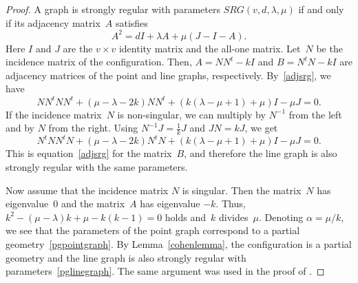 \documentclass[12pt, reqno]{amsart}
\begin{document}
\begin{proof}
A graph is strongly regular with parameters $SRG(v,d,\lambda,\mu)$ if and only if its adjacency matrix~$A$
satisfies
\begin{equation}\label{adjsrg}
A^2= dI+\lambda A+\mu (J-I-A).
\end{equation}
Here $I$ and $J$ are the $v\times v$ identity matrix and the
all-one matrix. Let~$N$ be the incidence matrix of the configuration. Then, $A=N N^t-k I$ and $B=N^t N-k I$
are adjacency matrices of the point and line graphs, respectively.
By~\eqref{adjsrg}, we have
\begin{equation*}
N N^t N N^t +(\mu-\lambda-2k)N N^t+(k(\lambda-\mu+1)+\mu)I - \mu
J=0.
\end{equation*}
If the incidence matrix~$N$ is non-singular, we can multiply by $N^{-1}$ from the left
and by $N$ from the right. Using $N^{-1} J = \frac{1}{k} J$ and $J N=k J$, we get
\begin{equation*}
N^t N N^t N + (\mu-\lambda-2k)N^t N +(k(\lambda-\mu+1)+\mu)I - \mu
J=0.
\end{equation*}
This is equation~\eqref{adjsrg} for the matrix~$B$, and therefore the line graph is
also strongly regular with the same parameters.

Now assume that the incidence matrix $N$ is singular. Then the matrix~$N$ has eigenvalue~$0$
and the matrix~$A$ has eigenvalue $-k$. Thus, $k^2-(\mu-\lambda)k+\mu-k(k-1)=0$ holds
and~$k$ divides~$\mu$. Denoting $\alpha=\mu/k$, we see that the parameters of the point graph
correspond to a partial geometry~\eqref{pgpointgraph}. By Lemma~\ref{cohenlemma}, the
configuration is a partial geometry and the line graph is also strongly regular with
parameters~\eqref{pglinegraph}. The same argument was used in the proof of
\cite[Theorem 1.2]{BHT97}.
\end{proof}
\end{document}
